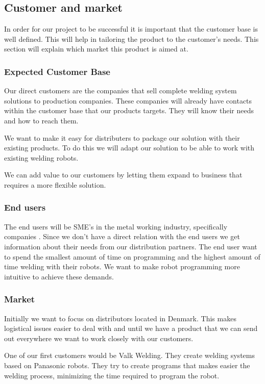 \subsection{Customer and market}
In order for our project to be successful it is important that the customer base is well defined. This will help in tailoring the product to the customer's needs. This section will explain which market this product is aimed at. 
\subsubsection{Expected Customer Base}
Our direct customers are the companies that sell complete welding system solutions to production companies. 
These companies will already have contacts within the customer base that our products targets.
They will know their needs and how to reach them. 

We want to make it easy for distributers to package our solution with their existing products.
To do this we will adapt our solution to be able to work with existing welding robots.

We can add value to our customers by letting them expand to business that requires a more flexible solution.

\subsubsection{End users}
The end users will be SME's in the metal working industry, specifically companies .
Since we don't have a direct relation with the end users we get information about their needs from our distribution partners.
The end user want to spend the smallest amount of time on programming and the highest amount of time welding with their robots.
We want to make robot programming more intuitive to achieve these demands.

\subsubsection{Market}
Initially we want to focus on distributors located in Denmark.
This makes logistical issues easier to deal with and until we have a product that we can send out everywhere we want to work closely with our customers.

One of our first customers would be Valk Welding. They create welding systems based on Panasonic robots. They try to create programs that makes easier the welding process, minimizing the time required to program the robot.

